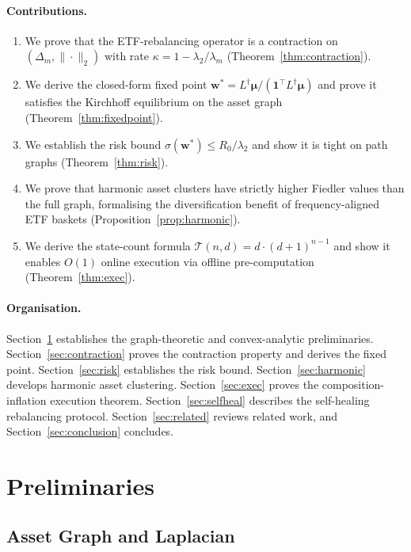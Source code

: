 \documentclass[twocolumn,11pt,a4paper]{article}
\theoremstyle{remark}
\newcommand{\one}{\mathbf{1}}
\newcommand{\bw}{\mathbf{w}}
\newcommand{\bmu}{\bm{\mu}}
\newcommand{\Dm}{\Delta_m}
\newcommand{\Ld}{L^\dagger}
\newcommand{\lam}[1]{\lambda_{#1}}
\newcommand{\kap}{\kappa}
\newcommand{\T}{\mathcal{T}}
\begin{document}
\paragraph{Contributions.}
\begin{enumerate}[leftmargin=*, label=(\roman*)]
\item We prove that the ETF-rebalancing operator is a contraction on
  $(\Dm, \|\cdot\|_2)$ with rate $\kap = 1 - \lam{2}/\lam{m}$ (Theorem~\ref{thm:contraction}).
\item We derive the closed-form fixed point $\bw^* = \Ld\bmu/(\one^\top\Ld\bmu)$
  and prove it satisfies the Kirchhoff equilibrium on the asset graph (Theorem~\ref{thm:fixedpoint}).
\item We establish the risk bound $\sigma(\bw^*) \leq R_0/\lam{2}$ and show it is tight
  on path graphs (Theorem~\ref{thm:risk}).
\item We prove that harmonic asset clusters have strictly higher Fiedler values than
  the full graph, formalising the diversification benefit of frequency-aligned ETF baskets
  (Proposition~\ref{prop:harmonic}).
\item We derive the state-count formula $\T(n,d) = d\cdot(d+1)^{n-1}$
  and show it enables $O(1)$ online execution via offline pre-computation (Theorem~\ref{thm:exec}).
\end{enumerate}

\paragraph{Organisation.}
Section~\ref{sec:prelim} establishes the graph-theoretic and convex-analytic
preliminaries. Section~\ref{sec:contraction} proves the contraction property and
derives the fixed point. Section~\ref{sec:risk} establishes the risk bound.
Section~\ref{sec:harmonic} develops harmonic asset clustering.
Section~\ref{sec:exec} proves the composition-inflation execution theorem.
Section~\ref{sec:selfheal} describes the self-healing rebalancing protocol.
Section~\ref{sec:related} reviews related work, and Section~\ref{sec:conclusion}
concludes.


\section{Preliminaries}
\label{sec:prelim}

\subsection{Asset Graph and Laplacian}
\end{document}
